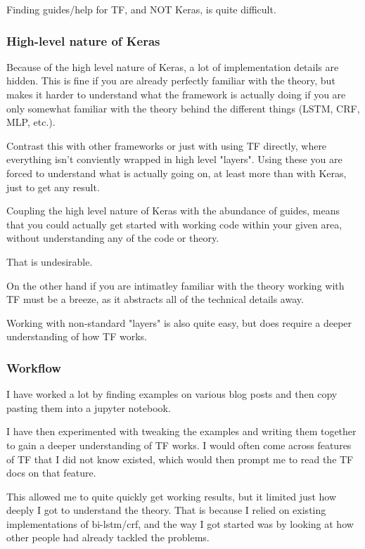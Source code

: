 Finding guides/help for TF, and NOT Keras, is quite difficult.

\subsubsection{High-level nature of Keras}

Because of the high level nature of Keras, a lot of implementation details are hidden. This is fine if you are already perfectly familiar with the theory, but makes it harder to understand what the framework is actually doing if you are only somewhat familiar with the theory behind the different things  (LSTM, CRF, MLP, etc.).

Contrast this with other frameworks or just with using TF directly, where everything isn't conviently wrapped in high level "layers". Using these you are forced to understand what is actually going on, at least more than with Keras, just to get any result.

Coupling the high level nature of Keras with the abundance of guides, means that you could actually get started with working code within your given area, without understanding any of the code or theory.

That is undesirable.

On the other hand if you are intimatley familiar with the theory working with TF must be a breeze, as it abstracts all of the technical details away.

Working with non-standard "layers" is also quite easy, but does require a deeper understanding of how TF works.

\subsubsection{Workflow}

I have worked a lot by finding examples on various blog posts and then copy pasting them into a jupyter notebook.

I have then experimented with tweaking the examples and writing them together to gain a deeper understanding of TF works. I would often come across features of TF that I did not know existed, which would then prompt me to read the TF docs on that feature.

This allowed me to quite quickly get working results, but it limited just how deeply I got to understand the theory. That is because I relied on existing implementations of bi-lstm/crf, and the way I got started was by looking at how other people had already tackled the problems.

